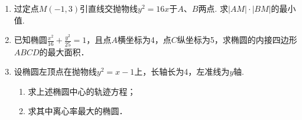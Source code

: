 \begin{enumerate}
\item 过定点$M(-1,3)$引直线交抛物线$y^2=16x$于$A$、$B$两点. 求$|AM|\cdot |BM|$的最小值.
\item 已知椭圆$\frac{x^2}{16}+\frac{y^2}{25}=1$，且点$A$横坐标为4，点$C$纵坐标为5，求椭圆的内接四边形$ABCD$的最大面积．

\item 设椭圆左顶点在抛物线$y^2=x-1$上，长轴长为4，左准线为$y$轴.
\begin{enumerate}[(1)]
\item 求上述椭圆中心的轨迹方程；
\item 求其中离心率最大的椭圆．
\end{enumerate}

\end{enumerate}
